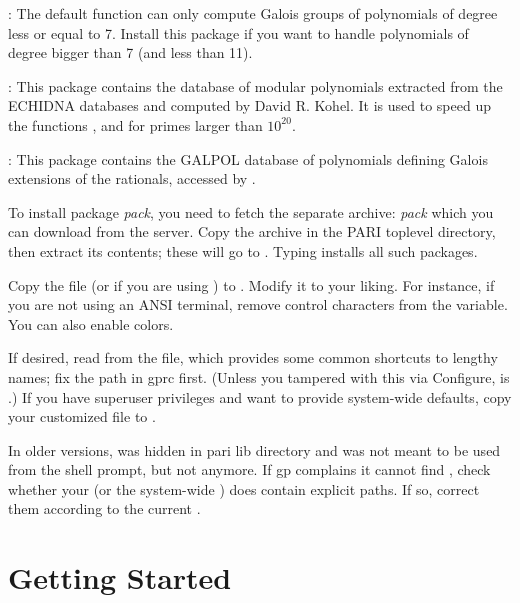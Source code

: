 \item {}: The default  function can only
compute Galois groups of polynomials of degree less or equal to 7. Install
this package if you want to handle polynomials of degree bigger than 7 (and
less than 11).

\item {}: This package contains the database of modular
polynomials extracted from the ECHIDNA databases and computed by David R.
Kohel. It is used to speed up the functions ,  and
 for primes larger than $10^{20}$.

\item {}: This package contains the GALPOL database of polynomials
defining Galois extensions of the rationals, accessed by .

\medskip

To install package \emph{pack}, you need to fetch the separate archive:
\emph{pack} which you can download from the  server.
Copy the archive in the PARI toplevel directory, then extract its
contents; these will go to . Typing  installs all such packages.

 Copy the file  (or
 if you are using ) to . Modify
it to your liking. For instance, if you are not using an ANSI terminal,
remove control characters from the  variable. You can also
enable colors.

If desired, read   from the 
file, which provides some common shortcuts to lengthy names; fix the path in
gprc first. (Unless you tampered with this via Configure,  is
.) If you have superuser privileges and want to
provide system-wide defaults, copy your customized  file to
.

In older versions,  was hidden in pari lib directory and was not
meant to be used from the shell prompt, but not anymore. If gp complains it
cannot find , check whether your  (or the system-wide
) does contain explicit paths. If so, correct them according to the
current .

\section{Getting Started}

